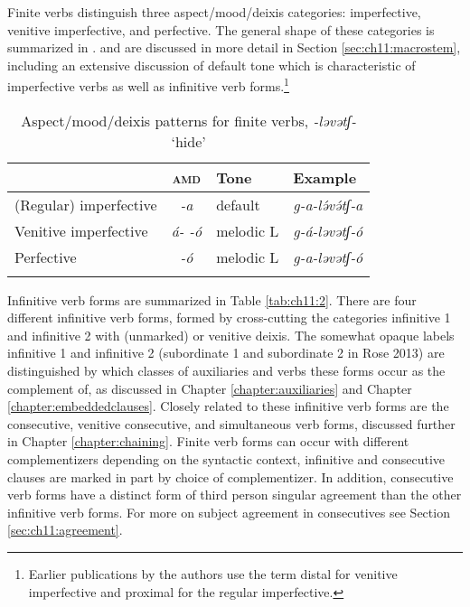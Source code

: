 Finite verbs distinguish three aspect/mood/deixis categories: imperfective, venitive imperfective, and perfective. The general shape of these categories is summarized in .  and are discussed in more detail in Section \ref{sec:ch11:macrostem}, including an extensive discussion of default tone which is characteristic of imperfective verbs as well as infinitive verb forms.\footnote{Earlier publications by the authors use the term distal for venitive imperfective and proximal for the regular imperfective.}

\begin{table}
\begin{tabular}[t]{lcll}
\lsptoprule
						&  \textsc{amd}  		& Tone 			& Example \\
\midrule
(Regular) imperfective 	& \textit{-a} 	& default		& \textit{g-a-lə́və́tʃ-a} \\
Venitive imperfective 	& \textit{á- -ó} & melodic L 	& \textit{g-á-ləvətʃ-ó} \\	
Perfective 				& \textit{-ó} 	& melodic L 	& \textit{g-a-ləvətʃ-ó}  \\
\lspbottomrule
\end{tabular}	
\caption{Aspect/mood/deixis patterns for finite verbs, \textit{-ləvətʃ-} `hide'}
\label{tab:ch11:1}
\end{table}


Infinitive verb forms are summarized in Table \ref{tab:ch11:2}. There are four different infinitive verb forms, formed by cross-cutting the categories infinitive 1 and infinitive 2 with (unmarked) or venitive deixis. The somewhat opaque labels infinitive 1 and infinitive 2 (subordinate 1 and subordinate 2 in Rose 2013) are distinguished by which classes of auxiliaries and verbs these forms occur as the complement of, as discussed in Chapter \ref{chapter:auxiliaries} and Chapter \ref{chapter:embeddedclauses}. Closely related to these infinitive verb forms are the consecutive, venitive consecutive, and simultaneous verb forms, discussed further in Chapter \ref{chapter:chaining}. Finite verb forms can occur with different complementizers depending on the syntactic context, infinitive and consecutive clauses are marked in part by choice of complementizer. In addition, consecutive verb forms have a distinct form of third person singular agreement than the other infinitive verb forms. For more on subject agreement in consecutives see Section \ref{sec:ch11:agreement}.

